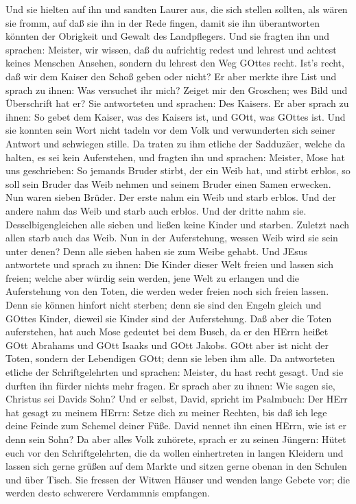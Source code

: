 Und sie hielten auf ihn und sandten Laurer aus, die sich stellen
sollten, als wären sie fromm, auf daß sie ihn in der Rede fingen, damit
sie ihn überantworten könnten der Obrigkeit und Gewalt des Landpflegers.
 Und sie fragten ihn und sprachen: Meister, wir wissen, daß
du aufrichtig redest und lehrest und achtest keines Menschen Ansehen,
sondern du lehrest den Weg GOttes recht.  Ist's recht, daß
wir dem Kaiser den Schoß geben oder nicht?  Er aber merkte
ihre List und sprach zu ihnen: Was versuchet ihr mich? 
Zeiget mir den Groschen; wes Bild und Überschrift hat er? Sie
antworteten und sprachen: Des Kaisers.  Er aber sprach zu
ihnen: So gebet dem Kaiser, was des Kaisers ist, und GOtt, was GOttes
ist.  Und sie konnten sein Wort nicht tadeln vor dem Volk
und verwunderten sich seiner Antwort und schwiegen stille. 
Da traten zu ihm etliche der Sadduzäer, welche da halten, es sei kein
Auferstehen, und fragten ihn  und sprachen: Meister, Mose
hat uns geschrieben: So jemands Bruder stirbt, der ein Weib hat, und
stirbt erblos, so soll sein Bruder das Weib nehmen und seinem Bruder
einen Samen erwecken.  Nun waren sieben Brüder. Der erste
nahm ein Weib und starb erblos.  Und der andere nahm das
Weib und starb auch erblos.  Und der dritte nahm sie.
Desselbigengleichen alle sieben und ließen keine Kinder und starben.
 Zuletzt nach allen starb auch das Weib.  Nun
in der Auferstehung, wessen Weib wird sie sein unter denen? Denn alle
sieben haben sie zum Weibe gehabt.  Und JEsus antwortete
und sprach zu ihnen: Die Kinder dieser Welt freien und lassen sich
freien;  welche aber würdig sein werden, jene Welt zu
erlangen und die Auferstehung von den Toten, die werden weder freien
noch sich freien lassen.  Denn sie können hinfort nicht
sterben; denn sie sind den Engeln gleich und GOttes Kinder, dieweil sie
Kinder sind der Auferstehung.  Daß aber die Toten
auferstehen, hat auch Mose gedeutet bei dem Busch, da er den HErrn
heißet GOtt Abrahams und GOtt Isaaks und GOtt Jakobs.  GOtt
aber ist nicht der Toten, sondern der Lebendigen GOtt; denn sie leben
ihm alle.  Da antworteten etliche der Schriftgelehrten und
sprachen: Meister, du hast recht gesagt.  Und sie durften
ihn fürder nichts mehr fragen.  Er sprach aber zu ihnen:
Wie sagen sie, Christus sei Davids Sohn?  Und er selbst,
David, spricht im Psalmbuch: Der HErr hat gesagt zu meinem HErrn: Setze
dich zu meiner Rechten,  bis daß ich lege deine Feinde zum
Schemel deiner Füße.  David nennet ihn einen HErrn, wie ist
er denn sein Sohn?  Da aber alles Volk zuhörete, sprach er
zu seinen Jüngern:  Hütet euch vor den Schriftgelehrten,
die da wollen einhertreten in langen Kleidern und lassen sich gerne
grüßen auf dem Markte und sitzen gerne obenan in den Schulen und über
Tisch.  Sie fressen der Witwen Häuser und wenden lange
Gebete vor; die werden desto schwerere Verdammnis empfangen.

